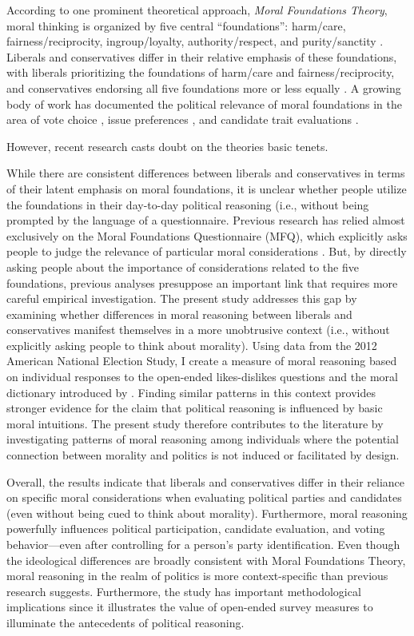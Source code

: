 \documentclass[12pt]{article}
\begin{document}
According to one prominent theoretical approach, \textit{Moral Foundations Theory}, moral thinking is organized by five central ``foundations'': harm/care, fairness/reciprocity, ingroup/loyalty, authority/respect, and purity/sanctity \citep{haidt2008moral}. Liberals and conservatives differ in their relative emphasis of these foundations, with liberals prioritizing the foundations of harm/care and fairness/reciprocity, and conservatives endorsing all five foundations more or less equally \citep{graham2009liberals}. A growing body of work has documented the political relevance of moral foundations in the area of vote choice \citep{iyer2010beyond, franks2015using}, issue preferences \citep{koleva2012tracing, low2015moral, clifford2015concerns}, and candidate trait evaluations \citep{clifford2014linking}.

However, recent research casts doubt on the theories basic tenets.

While there are consistent differences between liberals and conservatives in terms of their latent emphasis on moral foundations, it is unclear whether people utilize the foundations in their day-to-day political reasoning (i.e., without being prompted by the language of a questionnaire. Previous research has relied almost exclusively on the Moral Foundations Questionnaire (MFQ), which explicitly asks people to judge the relevance of particular moral considerations \citep[e.g.][]{graham2011mapping}. But, by directly asking people about the importance of considerations related to the five foundations, previous analyses presuppose an important link that requires more careful empirical investigation. The present study addresses this gap by examining whether differences in moral reasoning between liberals and conservatives manifest themselves in a more unobtrusive context (i.e., without explicitly asking people to think about morality). Using data from the 2012 American National Election Study, I create a measure of moral reasoning based on individual responses to the open-ended likes-dislikes questions and the moral dictionary introduced by \citet{graham2009liberals}. Finding similar patterns in this context provides stronger evidence for the claim that political reasoning is influenced by basic moral intuitions. The present study therefore contributes to the literature by investigating patterns of moral reasoning among individuals where the potential connection between morality and politics is not induced or facilitated by design.

Overall, the results indicate that liberals and conservatives differ in their reliance on specific moral considerations when evaluating political parties and candidates (even without being cued to think about morality). Furthermore, moral reasoning powerfully influences political participation, candidate evaluation, and voting behavior---even after controlling for a person’s party identification. Even though the ideological differences are broadly consistent with Moral Foundations Theory, moral reasoning in the realm of politics is more context-specific than previous research suggests. Furthermore, the study has important methodological implications since it illustrates the value of open-ended survey measures to illuminate the antecedents of political reasoning.
\end{document}
